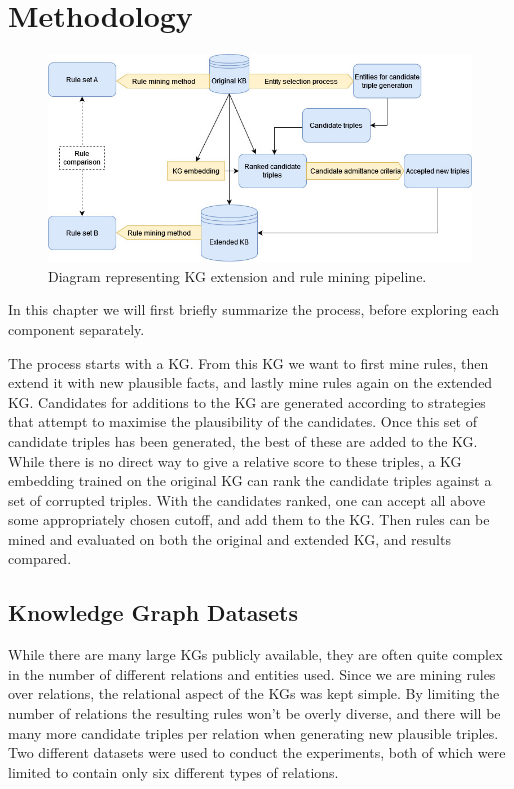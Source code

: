 \chapter{Methodology}

\begin{figure}[htp]
    \centering
    \includegraphics[width=16cm]{figures/ontology_mining_pipeline.jpg}
    \caption{Diagram representing KG extension and rule mining pipeline.}
\end{figure}

In this chapter we will first briefly summarize the process, before exploring each component separately.

The process starts with a KG. From this KG we want to first mine rules, then extend it with new plausible facts, and lastly mine rules again on the extended KG. Candidates for additions to the KG are generated according to strategies that attempt to maximise the plausibility of the candidates. Once this set of candidate triples has been generated, the best of these are added to the KG. While there is no direct way to give a relative score to these triples, a KG embedding trained on the original KG can rank the candidate triples against a set of corrupted triples. With the candidates ranked, one can accept all above some appropriately chosen cutoff, and add them to the KG. Then rules can be mined and evaluated on both the original and extended KG, and results compared.

\section{Knowledge Graph Datasets}
While there are many large KGs publicly available, they are often quite complex in the number of different relations and entities used. Since we are mining rules over relations, the relational aspect of the KGs was kept simple. By limiting the number of relations the resulting rules  won't be overly diverse, and there will be many more candidate triples per relation when generating new plausible triples. Two different datasets were used to conduct the experiments, both of which were limited to contain only six different types of relations.


